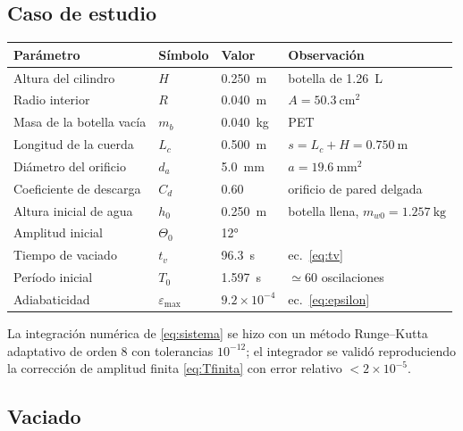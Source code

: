 \documentclass[11pt,a4paper]{article}
\newcommand{\eps}{\varepsilon}
\begin{document}
\subsection{Caso de estudio}

\begin{center}
\renewcommand{\arraystretch}{1.15}
\begin{tabular}{@{}llll@{}}
\toprule
\textbf{Parámetro} & \textbf{Símbolo} & \textbf{Valor} & \textbf{Observación}\\
\midrule
Altura del cilindro      & $H$      & \SI{0.250}{\meter}   & botella de \SI{1.26}{\liter}\\
Radio interior           & $R$      & \SI{0.040}{\meter}   & $A=\SI{50.3}{\centi\meter\squared}$\\
Masa de la botella vacía & $m_b$    & \SI{0.040}{\kilo\gram} & PET\\
Longitud de la cuerda    & $L_c$    & \SI{0.500}{\meter}   & $s=L_c+H=\SI{0.750}{\meter}$\\
Diámetro del orificio    & $d_a$    & \SI{5.0}{\milli\meter} & $a=\SI{19.6}{\milli\meter\squared}$\\
Coeficiente de descarga  & $C_d$    & $0.60$               & orificio de pared delgada\\
Altura inicial de agua   & $h_0$    & \SI{0.250}{\meter}   & botella llena, $m_{w0}=\SI{1.257}{\kilo\gram}$\\
Amplitud inicial         & $\Theta_0$ & \ang{12}           & \\
\midrule
Tiempo de vaciado        & $t_v$    & \SI{96.3}{\second}   & ec.~\eqref{eq:tv}\\
Período inicial          & $T_0$    & \SI{1.597}{\second}  & $\simeq 60$ oscilaciones\\
Adiabaticidad            & $\eps_{\max}$ & $9.2\times10^{-4}$ & ec.~\eqref{eq:epsilon}\\
\bottomrule
\end{tabular}
\end{center}

La integración numérica de \eqref{eq:sistema} se hizo con un método Runge--Kutta adaptativo de
orden 8 con tolerancias $10^{-12}$; el integrador se validó reproduciendo la corrección de
amplitud finita \eqref{eq:Tfinita} con error relativo $<2\times10^{-5}$.

\subsection{Vaciado}
\end{document}
